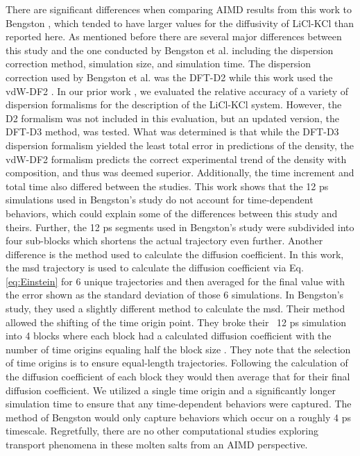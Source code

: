 \documentclass[review]{elsarticle}
\providecommand{\DIFaddtex}[1]{{\protect\color{blue} \sf #1}} %
\providecommand{\DIFaddbegin}{} %
\providecommand{\DIFaddend}{} %
\providecommand{\DIFadd}[1]{\texorpdfstring{\DIFaddtex{#1}}{#1}} %
\newcommand{\DIFaddincludegraphics}[2][]{{\color{blue}\fbox{\DIFOincludegraphics[#1]{#2}}}} %
\DeclareRobustCommand{\DIFaddbegin}{\DIFOaddbegin \let\includegraphics\DIFaddincludegraphics} %
\DeclareRobustCommand{\DIFaddend}{\DIFOaddend \let\includegraphics\DIFOincludegraphics} %
\begin{document}
There are significant differences when comparing AIMD results from this work to Bengston \cite{Bengston2014}, which tended to have larger values for the diffusivity of LiCl-KCl than reported here. As mentioned before there are several major differences between this study and the one conducted by Bengston et al. \cite{Bengston2014} including the dispersion correction method, simulation size, and simulation time. The dispersion correction used by Bengston et al. was the DFT-D2\cite{grimme} while this work used the vdW-DF2 \cite{Dion2004}. In our prior work \cite{duemmler_liclkcl}, we evaluated the relative accuracy of a variety of dispersion formalisms for the description of the LiCl-KCl system. However, the D2 formalism was not included in this evaluation, but an updated version, the DFT-D3 method, was tested. What was determined is that while the DFT-D3 dispersion formalism yielded the least total error in predictions of the density, the vdW-DF2 formalism predicts the correct experimental trend of the density with composition, and thus was deemed superior. Additionally, the time increment and total time also differed between the studies. This work shows that the 12 ps simulations used in Bengston's study do not account for time-dependent behaviors, which could explain some of the differences between this study and theirs. Further, the 12 ps segments used in Bengston's study were subdivided into four sub-blocks which shortens the actual trajectory even further.\DIFaddbegin \DIFadd{Another difference is the method used to calculate the diffusion coefficient. In this work, the msd trajectory is used to calculate the diffusion coefficient via Eq. \ref{eq:Einstein} for 6 unique trajectories and then averaged for the final value with the error shown as the standard deviation of those 6 simulations. In Bengston's study, they used a slightly different method to calculate the msd. Their method allowed the shifting of the time origin point. They broke their ~12 ps simulation into 4 blocks where each block had a calculated diffusion coefficient with the number of time origins equaling half the block size \cite{Bengston2014}. They note that the selection of time origins is to ensure equal-length trajectories. Following the calculation of the diffusion coefficient of each block they would then average that for their final diffusion coefficient. We utilized a single time origin and a significantly longer simulation time to ensure that any time-dependent behaviors were captured. The method of Bengston would only capture behaviors which occur on a roughly 4 ps timescale. }\DIFaddend Regretfully, there are no other computational studies exploring transport phenomena in these molten salts from an AIMD perspective.
\end{document}
